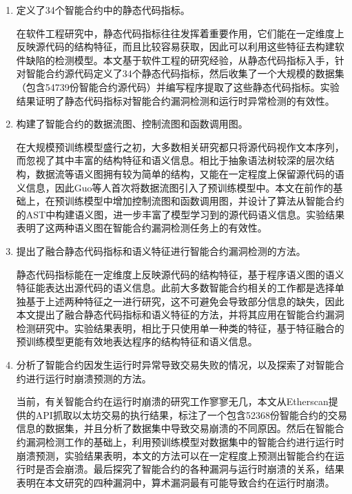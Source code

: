 \begin{enumerate}[label=(\arabic*)]
    \item 定义了34个智能合约中的静态代码指标。
    
    在软件工程研究中，静态代码指标往往发挥着重要作用，它们能在一定维度上反映源代码的结构特征，而且比较容易获取，因此可以利用这些特征去构建软件缺陷的检测模型。本文基于软件工程的研究经验，从静态代码指标入手，针对智能合约源代码定义了34个静态代码指标，然后收集了一个大规模的数据集（包含\num{54739}份智能合约源代码）并编写程序提取了这些静态代码指标。实验结果证明了静态代码指标对智能合约漏洞检测和运行时异常检测的有效性。
    
    \item 构建了智能合约的数据流图、控制流图和函数调用图。
    
    在大规模预训练模型盛行之初，大多数相关研究都只将源代码视作文本序列，而忽视了其中丰富的结构特征和语义信息。相比于抽象语法树较深的层次结构，数据流等语义图拥有较为简单的结构，又能在一定程度上保留源代码的语义信息，因此Guo等人\cite{guo2020graphcodebert}首次将数据流图引入了预训练模型中。本文在前作的基础上，在预训练模型中增加控制流图和函数调用图，并设计了算法从智能合约的AST中构建语义图，进一步丰富了模型学习到的源代码语义信息。实验结果表明了这两种语义图在智能合约漏洞检测任务上的有效性。

    \item 提出了融合静态代码指标和语义特征进行智能合约漏洞检测的方法。
    
    静态代码指标能在一定维度上反映源代码的结构特征，基于程序语义图的语义特征能表达出源代码的语义信息。此前大多数智能合约相关的工作都是选择单独基于上述两种特征之一进行研究，这不可避免会导致部分信息的缺失，因此本文提出了融合静态代码指标和语义特征的方法，并将其应用在智能合约漏洞检测研究中。实验结果表明，相比于只使用单一种类的特征，基于特征融合的预训练模型更能有效地表达程序的结构特征和语义信息。

    \item 分析了智能合约因发生运行时异常导致交易失败的情况，以及探索了对智能合约进行运行时崩溃预测的方法。

    当前，有关智能合约在运行时崩溃的研究工作寥寥无几，本文从Etherscan提供的API抓取以太坊交易的执行结果，标注了一个包含\num{52368}份智能合约的交易信息的数据集，并且分析了数据集中导致交易崩溃的不同原因。然后在智能合约漏洞检测工作的基础上，利用预训练模型对数据集中的智能合约进行运行时崩溃预测，实验结果表明，本文的方法可以在一定程度上预测出智能合约在运行时是否会崩溃。最后探究了智能合约的各种漏洞与运行时崩溃的关系，结果表明在本文研究的四种漏洞中，算术漏洞最有可能导致合约在运行时崩溃。

\end{enumerate}
